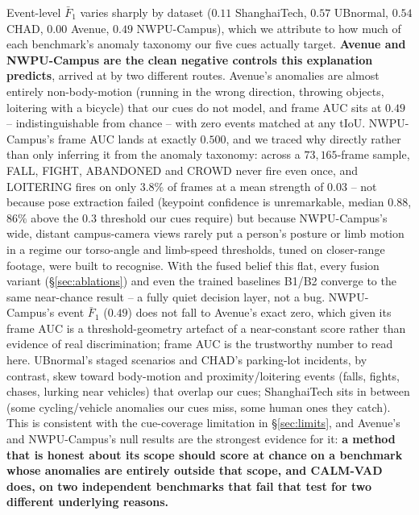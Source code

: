 \documentclass[conference]{IEEEtran}
\begin{document}
Event-level $\bar F_1$ varies sharply by dataset ($0.11$ ShanghaiTech, $0.57$
UBnormal, $0.54$ CHAD, $\mathbf{0.00}$ Avenue, $0.49$ NWPU-Campus), which we
attribute to how much of each benchmark's anomaly taxonomy our five cues
actually target. \textbf{Avenue and NWPU-Campus are the clean negative
controls this explanation predicts}, arrived at by two different routes.
Avenue's anomalies are almost entirely non-body-motion (running in the wrong
direction, throwing objects, loitering with a bicycle) that our cues do not
model, and frame AUC sits at $0.49$ -- indistinguishable from chance -- with
zero events matched at any tIoU. NWPU-Campus's frame AUC lands at exactly
$0.500$, and we traced why directly rather than only inferring it from the
anomaly taxonomy: across a $73{,}165$-frame sample, FALL, FIGHT, ABANDONED
and CROWD never fire even once, and LOITERING fires on only $3.8\%$ of
frames at a mean strength of $0.03$ -- not because pose extraction failed
(keypoint confidence is unremarkable, median $0.88$, $86\%$ above the
$0.3$ threshold our cues require) but because NWPU-Campus's wide,
distant campus-camera views rarely put a person's posture or limb motion in
a regime our torso-angle and limb-speed thresholds, tuned on closer-range
footage, were built to recognise. With the fused belief this flat, every
fusion variant (\S\ref{sec:ablations}) and even the trained baselines B1/B2
converge to the same near-chance result -- a fully quiet decision layer, not
a bug. NWPU-Campus's event $\bar F_1$ ($0.49$) does not fall to Avenue's
exact zero, which given its frame AUC is a threshold-geometry artefact of a
near-constant score rather than evidence of real discrimination; frame AUC
is the trustworthy number to read here. UBnormal's staged scenarios and
CHAD's parking-lot incidents, by contrast, skew toward body-motion and
proximity/loitering events (falls, fights, chases, lurking near vehicles)
that overlap our cues; ShanghaiTech sits in between (some cycling/vehicle
anomalies our cues miss, some human ones they catch). This is consistent with
the cue-coverage limitation in \S\ref{sec:limits}, and Avenue's and
NWPU-Campus's null results are the strongest evidence for it: \textbf{a
method that is honest about its scope should score at chance on a benchmark
whose anomalies are entirely outside that scope, and CALM-VAD does, on two
independent benchmarks that fail that test for two different underlying
reasons.}
\end{document}
